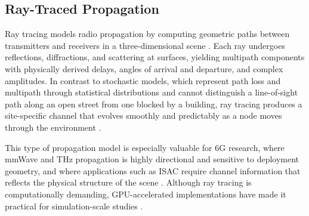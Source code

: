 \subsection{Ray-Traced Propagation}

Ray tracing models radio propagation by computing geometric paths between transmitters and receivers in a three-dimensional scene \cite{alsamman_mmwave,han_thz}.
Each ray undergoes reflections, diffractions, and scattering at surfaces, yielding multipath components with physically derived delays, angles of arrival and departure, and complex amplitudes.
In contrast to stochastic models, which represent path loss and multipath through statistical distributions and cannot distinguish a line-of-sight path along an open street from one blocked by a building, ray tracing produces a site-specific channel that evolves smoothly and predictably as a node moves through the environment \cite{alsamman_mmwave,tr38901}.

This type of propagation model is especially valuable for 6G research, where mmWave and THz propagation is highly directional and sensitive to deployment geometry, and where applications such as ISAC require channel information that reflects the physical structure of the scene \cite{uwaechia_mmwave,han_thz,zhou_isac}.
Although ray tracing is computationally demanding, GPU-accelerated implementations have made it practical for simulation-scale studies \cite{sionnart,raymobtime_sionna,cazzella_dt_mimo}.
